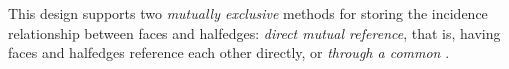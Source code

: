 This design supports two {\em mutually exclusive} methods for 
storing the incidence relationship between faces and halfedges:
{\em direct mutual reference}, that is, having faces and halfedges reference 
each other directly, or {\em through a common }.

